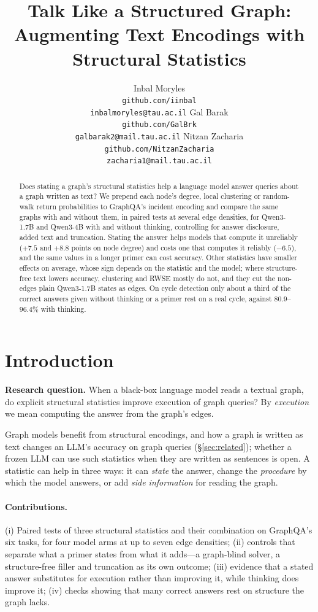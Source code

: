 \documentclass[11pt]{article}
\title{Talk Like a Structured Graph: Augmenting Text Encodings with Structural Statistics}
\author{
  Inbal Moryles\\
  \footnotesize\texttt{github.com/iinbal}\\
  \footnotesize\texttt{inbalmoryles@tau.ac.il}
  \And
  Gal Barak\\
  \footnotesize\texttt{github.com/GalBrk}\\
  \footnotesize\texttt{galbarak2@mail.tau.ac.il}
  \And
  Nitzan Zacharia\\
  \footnotesize\texttt{github.com/NitzanZacharia}\\
  \footnotesize\texttt{zacharia1@mail.tau.ac.il}
}
\date{}
\begin{document}
\maketitle
\begin{abstract}
Does stating a graph's structural statistics help a language model answer queries about a graph written as text? We prepend each node's degree, local clustering or random-walk return probabilities to GraphQA's incident encoding and compare the same graphs with and without them, in paired tests at several edge densities, for Qwen3-1.7B and Qwen3-4B with and without thinking, controlling for answer disclosure, added text and truncation. Stating the answer helps models that compute it unreliably ($+7.5$ and $+8.8$ points on node degree) and costs one that computes it reliably ($-6.5$), and the same values in a longer primer can cost accuracy. Other statistics have smaller effects on average, whose sign depends on the statistic and the model; where structure-free text lowers accuracy, clustering and RWSE mostly do not, and they cut the non-edges plain Qwen3-1.7B states as edges. On cycle detection only about a third of the correct answers given without thinking or a primer rest on a real cycle, against $80.9$--$96.4\%$ with thinking. %
\end{abstract}

\section{Introduction}
\label{sec:intro}
\textbf{Research question.} When a black-box language model reads a textual graph, do explicit structural statistics improve execution of graph queries? By \emph{execution} we mean computing the answer from the graph's edges.

Graph models benefit from structural encodings, and how a graph is written as text changes an LLM's accuracy on graph queries (\S\ref{sec:related}); whether a frozen LLM can use such statistics when they are written as sentences is open. A statistic can help in three ways: it can \emph{state} the answer, change the \emph{procedure} by which the model answers, or add \emph{side information} for reading the graph.

\paragraph{Contributions.} (i) Paired tests of three structural statistics and their combination on GraphQA's six tasks, for four model arms at up to seven edge densities; (ii) controls that separate what a primer states from what it adds---a graph-blind solver, a structure-free filler and truncation as its own outcome; (iii) evidence that a stated answer substitutes for execution rather than improving it, while thinking does improve it; (iv) checks showing that many correct answers rest on structure the graph lacks.
\end{document}
